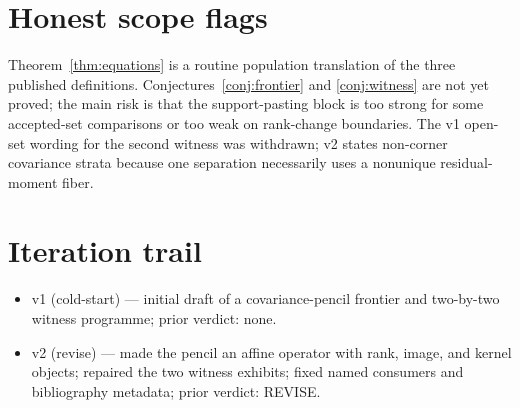\documentclass[11pt]{article}
\theoremstyle{definition}
\theoremstyle{plain}
\theoremstyle{remark}
\begin{document}
\section{Honest scope flags}
Theorem~\ref{thm:equations} is a routine population translation of the three published definitions. Conjectures~\ref{conj:frontier} and \ref{conj:witness} are not yet proved; the main risk is that the support-pasting block is too strong for some accepted-set comparisons or too weak on rank-change boundaries. The v1 open-set wording for the second witness was withdrawn; v2 states non-corner covariance strata because one separation necessarily uses a nonunique residual-moment fiber.

\section{Iteration trail}
\begin{itemize}[leftmargin=*]
\item v1 (cold-start) --- initial draft of a covariance-pencil frontier and two-by-two witness programme; prior verdict: none.
\item v2 (revise) --- made the pencil an affine operator with rank, image, and kernel objects; repaired the two witness exhibits; fixed named consumers and bibliography metadata; prior verdict: REVISE.
\end{itemize}
\end{document}
